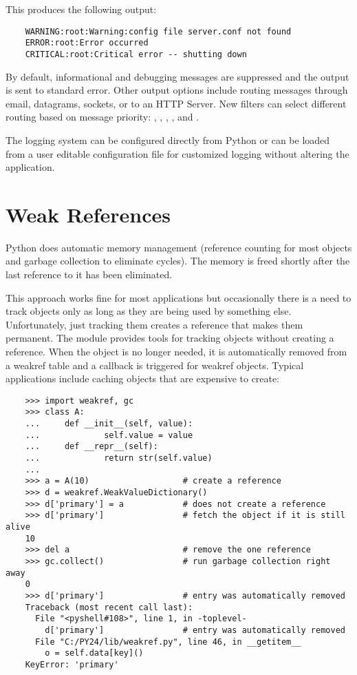 \documentclass{manual}
\begin{document}
This produces the following output: 

\begin{verbatim}
    WARNING:root:Warning:config file server.conf not found
    ERROR:root:Error occurred
    CRITICAL:root:Critical error -- shutting down
\end{verbatim}

By default, informational and debugging messages are suppressed and the
output is sent to standard error.  Other output options include routing
messages through email, datagrams, sockets, or to an HTTP Server.  New
filters can select different routing based on message priority:
, , , ,
and .

The logging system can be configured directly from Python or can be
loaded from a user editable configuration file for customized logging
without altering the application.


\section{Weak References\label{weak-references}}

Python does automatic memory management (reference counting for most
objects and garbage collection to eliminate cycles).  The memory is
freed shortly after the last reference to it has been eliminated.

This approach works fine for most applications but occasionally there
is a need to track objects only as long as they are being used by
something else.  Unfortunately, just tracking them creates a reference
that makes them permanent.  The
 module provides
tools for tracking objects without creating a reference.  When the
object is no longer needed, it is automatically removed from a weakref
table and a callback is triggered for weakref objects.  Typical
applications include caching objects that are expensive to create:

\begin{verbatim}
    >>> import weakref, gc
    >>> class A:
    ...     def __init__(self, value):
    ...             self.value = value
    ...     def __repr__(self):
    ...             return str(self.value)
    ...
    >>> a = A(10)                   # create a reference
    >>> d = weakref.WeakValueDictionary()
    >>> d['primary'] = a            # does not create a reference
    >>> d['primary']                # fetch the object if it is still alive
    10
    >>> del a                       # remove the one reference
    >>> gc.collect()                # run garbage collection right away
    0
    >>> d['primary']                # entry was automatically removed
    Traceback (most recent call last):
      File "<pyshell#108>", line 1, in -toplevel-
        d['primary']                # entry was automatically removed
      File "C:/PY24/lib/weakref.py", line 46, in __getitem__
        o = self.data[key]()
    KeyError: 'primary'
\end{verbatim}
\end{document}
